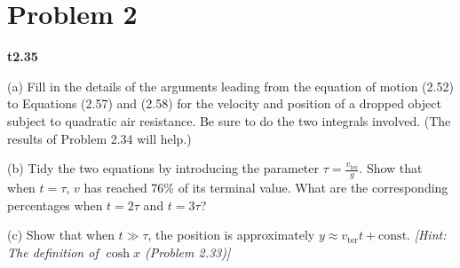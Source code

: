 \documentclass{article}
\numberwithin{equation}{section}
\begin{document}
\section{Problem 2}

\textbf{t2.35}

(a) Fill in the details of the arguments leading from the equation of motion (2.52) to Equations (2.57) and (2.58) for the velocity and position of a dropped object subject to quadratic air resistance. Be sure to do the two integrals involved. (The results of Problem 2.34 will help.)

(b) Tidy the two equations by introducing the parameter $\tau = \frac{v_{\text{ter}}}{g}$. Show that when $t = \tau$, $v$ has reached 76\% of its terminal value. What are the corresponding percentages when $t = 2\tau$ and $t = 3\tau$?

(c) Show that when $t \gg \tau$, the position is approximately $y \approx v_{\text{ter}} t + \text{const}$. \textit{[Hint: The definition of $\cosh x$ (Problem 2.33)]}
\end{document}
